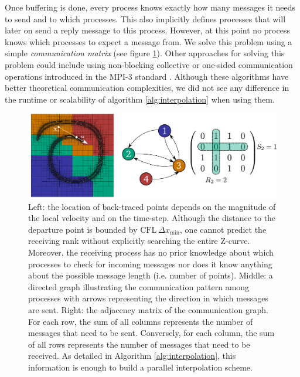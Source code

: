 Once buffering is done, every process knows exactly how many messages it needs to send and to which processes. This also implicitly defines processes that will later on send a reply message to this process. However, at this point no process knows which processes to expect a message from. We solve this problem using a simple \textit{communication matrix} (see figure \ref{fig:communication}). Other approaches for solving this problem could include using non-blocking collective or one-sided communication operations introduced in the MPI-3 standard \cite{Hoefler;Siebert;Lumsdaine:10:Scalable-communication}. Although these algorithms have better theoretical communication complexities, we did not see any difference in the runtime or scalability of algorithm \ref{alg:interpolation} when using them. 

\begin{figure}[htbp]
\begin{center}
\includegraphics[width = \textwidth] {figures/communication.pdf}
\end{center}
\caption{Left: the location of back-traced points depends on the magnitude of the local velocity and on the time-step. Although the distance to the departure point is bounded by $\text{CFL} \: \Delta x_{\min}$, one cannot predict the receiving rank without explicitly searching the entire Z-curve. Moreover, the receiving process has no prior knowledge about which processes to check for incoming messages nor does it know anything about the possible message length (i.e. number of points). Middle: a directed graph illustrating the communication pattern among processes with arrows representing the direction in which messages are sent. Right: the adjacency matrix of the communication graph. For each row, the sum of all columns represents the number of messages that need to be sent. Conversely, for each column, the sum of all rows represents the number of messages that need to be received. As detailed in Algorithm \ref{alg:interpolation}, this information is enough to build a parallel interpolation scheme.}
\label{fig:communication}
\end{figure}

